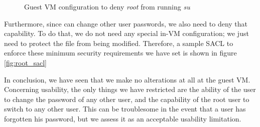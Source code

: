 \begin{figure}[ht]
	\centering
	\caption{Guest \ac{VM} configuration to deny \emph{root} from running \emph{su}}
	\label{fig:pam}
\end{figure}

\par Furthermore, since  can change other user passwords, we also need to deny that capability. To do that, we do not need any special in-\ac{VM} configuration; we just need to protect the  file from being modified. Therefore, a sample \ac{SACL} to enforce these minimum security requirements we have set is shown in figure \ref{fig:root_sacl}


\par In conclusion, we have seen that we make no alterations at all at the guest \ac{VM}. Concerning usability, the only things we have restricted are the ability of the  user to change the password of any other user, and the capability of the root user to switch to any other user. This can be troublesome in the event that a user has forgotten his password, but we assess it as an acceptable usability limitation.











